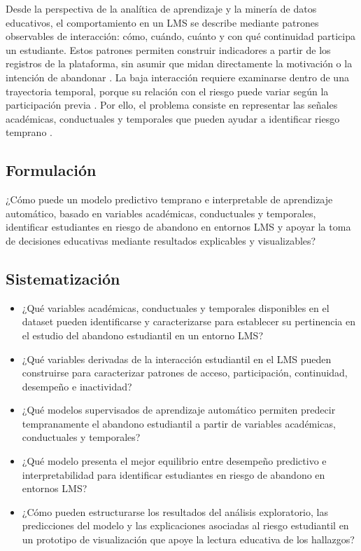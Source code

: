 Desde la perspectiva de la analítica de aprendizaje y la minería de datos educativos, el comportamiento en un LMS se describe mediante patrones observables de interacción: cómo, cuándo, cuánto y con qué continuidad participa un estudiante. Estos patrones permiten construir indicadores a partir de los registros de la plataforma, sin asumir que midan directamente la motivación o la intención de abandonar \cite{sdata2017171,0007767901540164,bonviewJDSIS42023777}. La baja interacción requiere examinarse dentro de una trayectoria temporal, porque su relación con el riesgo puede variar según la participación previa \cite{1049482020222124425,arXiv260408870}. Por ello, el problema consiste en representar las señales académicas, conductuales y temporales que pueden ayudar a identificar riesgo temprano \cite{bdcc9110297,03064190261439624}.


\subsection{Formulaci\'on}
¿Cómo puede un modelo predictivo temprano e interpretable de aprendizaje automático, basado en variables académicas,  conductuales y temporales, identificar estudiantes en riesgo de abandono en entornos LMS y apoyar la toma de decisiones educativas mediante resultados explicables y visualizables?

\subsection{Sistematizaci\'on}
\begin{itemize}
	\item ¿Qué variables académicas, conductuales y temporales disponibles en el dataset pueden identificarse y caracterizarse para establecer su pertinencia en el estudio del abandono estudiantil en un entorno LMS?
	
	\item ¿Qué variables derivadas de la interacción estudiantil en el LMS pueden construirse para caracterizar patrones de acceso, participación, continuidad, desempeño e inactividad?
	
	
	\item ¿Qué modelos supervisados de aprendizaje automático permiten predecir tempranamente el abandono estudiantil a partir de variables académicas, conductuales y temporales?
	
	\item ¿Qué modelo presenta el mejor equilibrio entre desempeño predictivo e interpretabilidad para identificar estudiantes en riesgo de abandono en entornos LMS?
	
	\item ¿Cómo pueden estructurarse los resultados del análisis exploratorio, las predicciones del modelo y las explicaciones asociadas al riesgo estudiantil en un prototipo de visualización que apoye la lectura educativa de los hallazgos?
\end{itemize}

